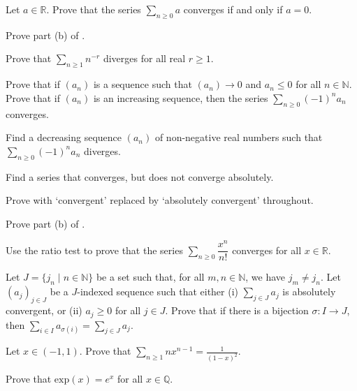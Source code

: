 \begin{exercise}
Let $a \in \mathbb{R}$. Prove that the series $\sum_{n \ge 0} a$ converges if and only if $a=0$.
\end{exercise}

\begin{exercise}
Prove part (b) of .
\end{exercise}

\begin{exercise}
Prove that $\displaystyle \sum_{n \ge 1} n^{-r}$ diverges for all real $r \ge 1$.
\end{exercise}


\begin{exercise}
Prove that if $(a_n)$ is a sequence such that $(a_n) \to 0$ and $a_n \le 0$ for all $n \in \mathbb{N}$. Prove that if $(a_n)$ is an increasing sequence, then the series $\displaystyle \sum_{n \ge 0} (-1)^n a_n$ converges.
\end{exercise}

\begin{exercise}
Find a decreasing sequence $(a_n)$ of non-negative real numbers such that $\displaystyle \sum_{n \ge 0} (-1)^n a_n$ diverges.
\end{exercise}


\begin{exercise}
Find a series that converges, but does not converge absolutely.
\end{exercise}

\begin{exercise}
Prove  with `convergent' replaced by `absolutely convergent' throughout.
\end{exercise}

\begin{exercise}
Prove part (b) of .
\end{exercise}


\begin{exercise}
\label{exExponentialFunctionCoverges}
Use the ratio test to prove that the series $\sum_{n \ge 0} \dfrac{x^n}{n!}$ converges for all $x \in \mathbb{R}$.
\end{exercise}


\begin{exercise}
Let $J = \{ j_n \mid n \in \mathbb{N} \}$ be a set such that, for all $m,n \in \mathbb{N}$, we have $j_m \ne j_n$. Let $(a_j)_{j \in J}$ be a $J$-indexed sequence such that either (i) $\sum_{j \in J} a_j$ is absolutely convergent, or (ii) $a_j \ge 0$ for all $j \in J$. Prove that if there is a bijection $\sigma : I \to J$, then $\sum_{i \in I} a_{\sigma(i)} = \sum_{j \in J} a_j$.
\end{exercise}


\begin{exercise}
Let $x \in (-1,1)$. Prove that $\displaystyle \sum_{n \ge 1} nx^{n-1} = \frac{1}{(1-x)^2}$.
\end{exercise}


\begin{exercise}
Prove that $\mathrm{exp}(x) = e^x$ for all $x \in \mathbb{Q}$.
\end{exercise}
